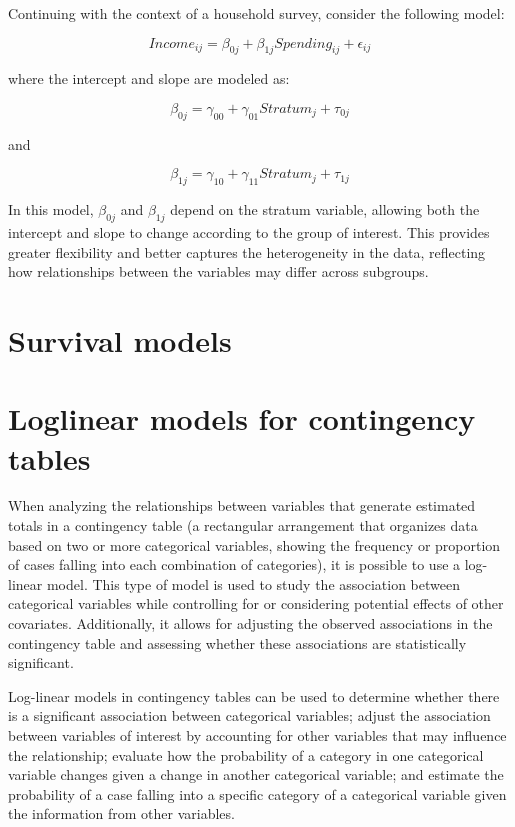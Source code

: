 \documentclass[
  12pt,
]{book}
\begin{document}
Continuing with the context of a household survey, consider the following model:

\[
Income_{ij} = \beta_{0j} + \beta_{1j} Spending_{ij} + \epsilon_{ij}
\]

where the intercept and slope are modeled as:

\[
\beta_{0j} = \gamma_{00} + \gamma_{01} Stratum_{j} + \tau_{0j}
\]

and

\[
\beta_{1j} = \gamma_{10} + \gamma_{11} Stratum_{j} + \tau_{1j}
\]

In this model, \(\beta_{0j}\) and \(\beta_{1j}\) depend on the stratum variable, allowing both the intercept and slope to change according to the group of interest. This provides greater flexibility and better captures the heterogeneity in the data, reflecting how relationships between the variables may differ across subgroups.

\hypertarget{survival-models}{%
\section{Survival models}\label{survival-models}}

\hypertarget{loglinear-models-for-contingency-tables}{%
\section{Loglinear models for contingency tables}\label{loglinear-models-for-contingency-tables}}

When analyzing the relationships between variables that generate estimated totals in a contingency table (a rectangular arrangement that organizes data based on two or more categorical variables, showing the frequency or proportion of cases falling into each combination of categories), it is possible to use a log-linear model. This type of model is used to study the association between categorical variables while controlling for or considering potential effects of other covariates. Additionally, it allows for adjusting the observed associations in the contingency table and assessing whether these associations are statistically significant.

Log-linear models in contingency tables can be used to determine whether there is a significant association between categorical variables; adjust the association between variables of interest by accounting for other variables that may influence the relationship; evaluate how the probability of a category in one categorical variable changes given a change in another categorical variable; and estimate the probability of a case falling into a specific category of a categorical variable given the information from other variables.
\end{document}
